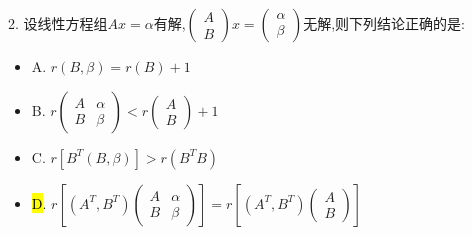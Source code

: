 2. 设线性方程组$Ax=\alpha$有解,$\left( \begin{matrix}
	A\\B
\end{matrix}\right)x=\left( \begin{matrix}
\alpha\\\beta
\end{matrix}\right) $无解,则下列结论正确的是:  
\begin{itemize}
	\item A. $r(B,\beta)=r(B)+1$
	\item B. $r\left(\begin{matrix}
		A&\alpha\\B&\beta
	\end{matrix}\right)<r\left( \begin{matrix}
	A\\B
\end{matrix}\right) +1$
	\item C. $r\left[B^{T}(B,\beta)\right]>r(B^{T}B)$ 
	\item \hl{D}. $r\left[(A^T,B^T)\left(\begin{matrix}
		A&\alpha\\B&\beta
	\end{matrix} \right) \right] =r\left[ (A^T,B^T)\left( \begin{matrix}
	A\\B
\end{matrix}\right) \right] $
\end{itemize}
